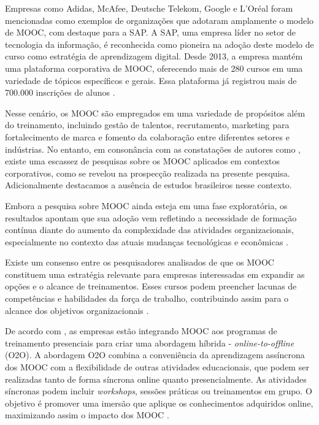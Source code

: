 \documentclass[portuguese]{textolivre}
\begin{document}
Empresas como Adidas, McAfee, Deutsche Telekom, Google e L'Oréal foram mencionadas como exemplos de organizações que adotaram amplamente o modelo de MOOC, com destaque para a SAP. A SAP, uma empresa líder no setor de tecnologia da informação, é reconhecida como pioneira na adoção deste modelo de curso como estratégia de aprendizagem digital. Desde 2013, a empresa mantém uma plataforma corporativa de MOOC, oferecendo mais de 280 cursos em uma variedade de tópicos específicos e gerais. Essa plataforma já registrou mais de 700.000 inscrições de alunos \cite{zur_transforming_2021}. 

Nesse cenário, os MOOC são empregados em uma variedade de propósitos além do treinamento, incluindo gestão de talentos, recrutamento, marketing para fortalecimento de marca e fomento da colaboração entre diferentes setores e indústrias.  No entanto, em consonância com as constatações de autores como \textcite{zur_transforming_2021,yan_construction_2022,park_moocs_2021}, existe uma escassez de pesquisas sobre os MOOC aplicados em contextos corporativos, como se revelou na prospecção realizada na presente pesquisa. Adicionalmente destacamos a ausência de estudos brasileiros nesse contexto. 

Embora a pesquisa sobre MOOC ainda esteja em uma fase exploratória, os resultados apontam que sua adoção vem refletindo a necessidade de formação contínua diante do aumento da complexidade das atividades organizacionais, especialmente no contexto das atuais mudanças tecnológicas e econômicas \cite{zur_transforming_2021}.

Existe um consenso entre os pesquisadores analisados de que os MOOC constituem uma estratégia relevante para empresas interessadas em expandir as opções e o alcance de treinamentos. Esses cursos podem preencher lacunas de competências e habilidades da força de trabalho, contribuindo assim para o alcance dos objetivos organizacionais \cite{becerra_diseno_2020,zur_transforming_2021,yan_construction_2022,park_moocs_2021}. 

De acordo com \textcite{yan_construction_2022}, as empresas estão integrando MOOC aos programas de treinamento presenciais para criar uma abordagem híbrida - \textit{online-to-offline} (O2O). A abordagem O2O combina a conveniência da aprendizagem assíncrona dos MOOC com a flexibilidade de outras atividades educacionais, que podem ser realizadas tanto de forma síncrona online quanto presencialmente. As atividades síncronas podem incluir \textit{workshops}, sessões práticas ou treinamentos em grupo. O objetivo é promover uma imersão que aplique os conhecimentos adquiridos online, maximizando assim o impacto dos MOOC \cite{yan_construction_2022}.
\end{document}
